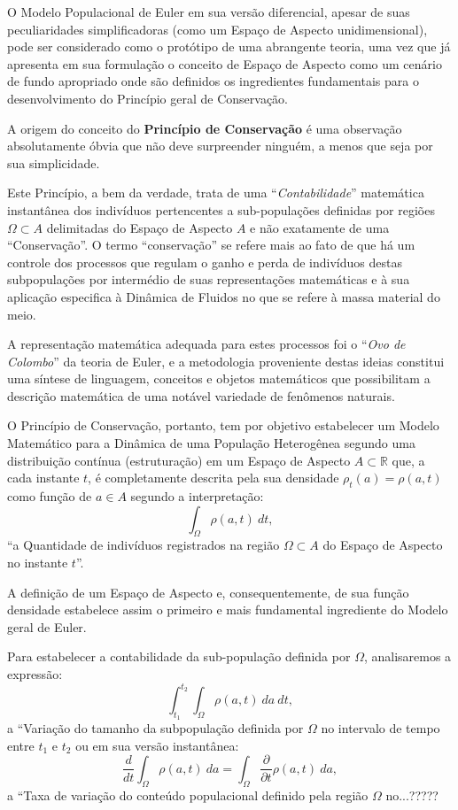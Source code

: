 O Modelo Populacional de Euler em sua versão diferencial, apesar de suas peculiaridades simplificadoras (como um Espaço de Aspecto unidimensional), pode ser considerado como o protótipo de uma abrangente teoria, uma vez que já apresenta em sua formulação o conceito de Espaço de Aspecto como um cenário de fundo apropriado onde são definidos os ingredientes fundamentais para o desenvolvimento do Princípio geral de Conservação.

A origem do conceito do \textbf{Princípio de Conservação} é uma observação absolutamente óbvia que não deve surpreender ninguém, a menos que seja por sua simplicidade.

Este Princípio, a bem da verdade, trata de uma ``\textit{Contabilidade}'' matemática instantânea dos indivíduos pertencentes a sub-populações definidas por regiões \(\Omega \subset A\) delimitadas do Espaço de Aspecto \(A\) e não exatamente de uma ``Conservação''. O termo ``conservação'' se refere mais ao fato de que há um controle dos processos que regulam o ganho e perda de indivíduos destas subpopulações por intermédio de suas representações matemáticas e à sua aplicação especifica à Dinâmica de Fluidos no que se refere à massa material do meio.

A representação matemática adequada para estes processos foi o ``\textit{Ovo de Colombo}'' da teoria de Euler, e a metodologia proveniente destas ideias constitui uma síntese de linguagem, conceitos e objetos matemáticos que possibilitam a descrição matemática de uma notável variedade de fenômenos naturais.

O Princípio de Conservação, portanto, tem por objetivo estabelecer um Modelo Matemático para a Dinâmica de uma População Heterogênea segundo uma distribuição contínua (estruturação) em um Espaço de Aspecto \(A \subset \mathbb{R}\) que, a cada instante \(t\), é completamente descrita pela sua densidade \(\rho_t(a) = \rho(a, t)\) como função de \(a \in A\) segundo a interpretação:
\[\displaystyle\int_\Omega \rho(a,t)\ dt,\]
``a Quantidade de indivíduos registrados na região \(\Omega \subset A\) do Espaço de Aspecto no instante \(t\)''.

A definição de um Espaço de Aspecto e, consequentemente, de sua função densidade estabelece assim o primeiro e mais fundamental ingrediente do Modelo geral de Euler.

Para estabelecer a contabilidade da sub-população definida por \(\Omega\), analisaremos a expressão:
\[\displaystyle\int_{t_1}^{t_2}\int_{\Omega} \rho(a,t)\ da\ dt,\]
a ``Variação do tamanho da subpopulação definida por \(\Omega\) no intervalo de tempo entre \(t_1\) e \(t_2\) ou em sua versão instantânea:
\[\displaystyle\dfrac{d}{dt}\int_{\Omega} \rho(a,t)\ da = 
\displaystyle\int_{\Omega} \dfrac{\partial}{\partial t}\rho(a,t)\ da,\]
a ``Taxa de variação do conteúdo populacional definido pela região \(\Omega\) no...?????

